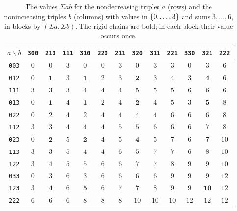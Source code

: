\documentclass[11pt,a4paper]{article}
\begin{document}
\begin{table}[htb]
\centering
\footnotesize
\setlength{\tabcolsep}{3.6pt}
\begin{tabular}{@{}c|ccc|ccc|ccc|ccc@{}}
\toprule
$a\backslash b$ & \texttt{300} & \texttt{210} & \texttt{111} & \texttt{310} & \texttt{220} & \texttt{211} & \texttt{320} & \texttt{311} & \texttt{221} & \texttt{330} & \texttt{321} & \texttt{222} \\
\midrule
\texttt{003} & $0$ & $0$ & $3$ & $0$ & $0$ & $3$ & $0$ & $3$ & $3$ & $0$ & $3$ & $6$ \\
\texttt{012} & $0$ & $\mathbf{1}$ & $3$ & $\mathbf{1}$ & $2$ & $3$ & $\mathbf{2}$ & $3$ & $4$ & $3$ & $\mathbf{4}$ & $6$ \\
\texttt{111} & $3$ & $3$ & $3$ & $4$ & $4$ & $4$ & $5$ & $5$ & $5$ & $6$ & $6$ & $6$ \\
\midrule
\texttt{013} & $0$ & $\mathbf{1}$ & $4$ & $\mathbf{1}$ & $2$ & $4$ & $\mathbf{2}$ & $4$ & $5$ & $3$ & $\mathbf{5}$ & $8$ \\
\texttt{022} & $0$ & $2$ & $4$ & $2$ & $4$ & $4$ & $4$ & $4$ & $6$ & $6$ & $6$ & $8$ \\
\texttt{112} & $3$ & $3$ & $4$ & $4$ & $4$ & $5$ & $5$ & $6$ & $6$ & $6$ & $7$ & $8$ \\
\midrule
\texttt{023} & $0$ & $\mathbf{2}$ & $5$ & $\mathbf{2}$ & $4$ & $5$ & $\mathbf{4}$ & $5$ & $7$ & $6$ & $\mathbf{7}$ & $10$ \\
\texttt{113} & $3$ & $3$ & $5$ & $4$ & $4$ & $6$ & $5$ & $7$ & $7$ & $6$ & $8$ & $10$ \\
\texttt{122} & $3$ & $4$ & $5$ & $5$ & $6$ & $6$ & $7$ & $7$ & $8$ & $9$ & $9$ & $10$ \\
\midrule
\texttt{033} & $0$ & $3$ & $6$ & $3$ & $6$ & $6$ & $6$ & $6$ & $9$ & $9$ & $9$ & $12$ \\
\texttt{123} & $3$ & $\mathbf{4}$ & $6$ & $\mathbf{5}$ & $6$ & $7$ & $\mathbf{7}$ & $8$ & $9$ & $9$ & $\mathbf{10}$ & $12$ \\
\texttt{222} & $6$ & $6$ & $6$ & $8$ & $8$ & $8$ & $10$ & $10$ & $10$ & $12$ & $12$ & $12$ \\
\bottomrule
\end{tabular}
\caption{The values $\Sigma ab$ for the nondecreasing triples $a$ (rows) and the nonincreasing triples $b$ (columns) with values in $\{0,\ldots,3\}$ and sums $3,\dots,6$, in blocks by $(\Sigma a,\Sigma b)$. The rigid chains are bold; in each block their value occurs once.}\label{tab:chain}
\end{table}
\end{document}
